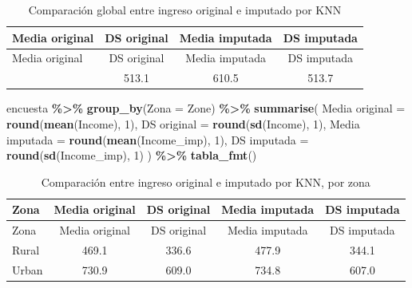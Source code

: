 \documentclass[
  spanish,
  12pt,
]{book}
\newenvironment{Shaded}{\begin{snugshade}}{\end{snugshade}}
\newcommand{\AttributeTok}[1]{\textcolor[rgb]{0.13,0.29,0.53}{#1}}
\newcommand{\DecValTok}[1]{\textcolor[rgb]{0.00,0.00,0.81}{#1}}
\newcommand{\FunctionTok}[1]{\textcolor[rgb]{0.13,0.29,0.53}{\textbf{#1}}}
\newcommand{\NormalTok}[1]{#1}
\newcommand{\OtherTok}[1]{\textcolor[rgb]{0.56,0.35,0.01}{#1}}
\newcommand{\SpecialCharTok}[1]{\textcolor[rgb]{0.81,0.36,0.00}{\textbf{#1}}}
\newcommand{\StringTok}[1]{\textcolor[rgb]{0.31,0.60,0.02}{#1}}
\begin{document}
\begin{longtable}[]{@{}lccc@{}}
\caption{\label{tab:tab-sesgo-knn-global}Comparación global entre ingreso original e imputado por KNN}\tabularnewline
\toprule\noalign{}
Media original & DS original & Media imputada & DS imputada \\
\midrule\noalign{}
\endfirsthead
\toprule\noalign{}
Media original & DS original & Media imputada & DS imputada \\
\midrule\noalign{}
\endhead
\bottomrule\noalign{}
\endlastfoot
604.2 & 513.1 & 610.5 & 513.7 \\
\end{longtable}

\begin{Shaded}
\begin{Highlighting}[]
\NormalTok{encuesta }\SpecialCharTok{\%\textgreater{}\%}
  \FunctionTok{group\_by}\NormalTok{(}\AttributeTok{Zona =}\NormalTok{ Zone) }\SpecialCharTok{\%\textgreater{}\%}
  \FunctionTok{summarise}\NormalTok{(}
    \StringTok{\textasciigrave{}}\AttributeTok{Media original}\StringTok{\textasciigrave{}}  \OtherTok{=} \FunctionTok{round}\NormalTok{(}\FunctionTok{mean}\NormalTok{(Income), }\DecValTok{1}\NormalTok{),}
    \StringTok{\textasciigrave{}}\AttributeTok{DS original}\StringTok{\textasciigrave{}}     \OtherTok{=} \FunctionTok{round}\NormalTok{(}\FunctionTok{sd}\NormalTok{(Income), }\DecValTok{1}\NormalTok{),}
    \StringTok{\textasciigrave{}}\AttributeTok{Media imputada}\StringTok{\textasciigrave{}}  \OtherTok{=} \FunctionTok{round}\NormalTok{(}\FunctionTok{mean}\NormalTok{(Income\_imp), }\DecValTok{1}\NormalTok{),}
    \StringTok{\textasciigrave{}}\AttributeTok{DS imputada}\StringTok{\textasciigrave{}}     \OtherTok{=} \FunctionTok{round}\NormalTok{(}\FunctionTok{sd}\NormalTok{(Income\_imp), }\DecValTok{1}\NormalTok{)}
\NormalTok{  ) }\SpecialCharTok{\%\textgreater{}\%} \FunctionTok{tabla\_fmt}\NormalTok{()}
\end{Highlighting}
\end{Shaded}

\begin{longtable}[]{@{}lcccc@{}}
\caption{\label{tab:tab-sesgo-knn-zona}Comparación entre ingreso original e imputado por KNN, por zona}\tabularnewline
\toprule\noalign{}
Zona & Media original & DS original & Media imputada & DS imputada \\
\midrule\noalign{}
\endfirsthead
\toprule\noalign{}
Zona & Media original & DS original & Media imputada & DS imputada \\
\midrule\noalign{}
\endhead
\bottomrule\noalign{}
\endlastfoot
Rural & 469.1 & 336.6 & 477.9 & 344.1 \\
Urban & 730.9 & 609.0 & 734.8 & 607.0 \\
\end{longtable}
\end{document}
